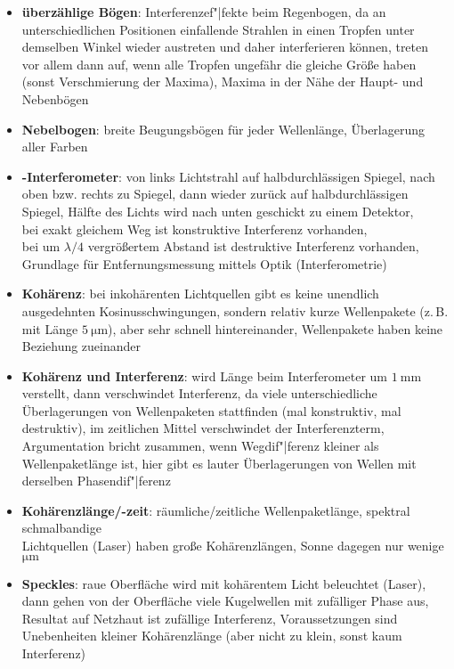 \linie
\begin{itemize}
    \item
    \textbf{überzählige Bögen}:
    Interferenzef"|fekte beim Regenbogen, da
    an unterschiedlichen Positionen einfallende Strahlen in einen Tropfen
    unter demselben Winkel wieder austreten und daher interferieren können,
    treten vor allem dann auf, wenn alle Tropfen ungefähr die gleiche Größe
    haben (sonst Verschmierung der Maxima),
    Maxima in der Nähe der Haupt- und Nebenbögen

    \item
    \textbf{Nebelbogen}:
    breite Beugungsbögen für jeder Wellenlänge, Überlagerung aller Farben
\end{itemize}
\linie
\pagebreak
\begin{itemize}
    \item
    \textbf{-Interferometer}:
    von links Lichtstrahl auf halbdurchlässigen Spiegel, nach oben bzw. rechts
    zu Spiegel, dann wieder zurück auf halbdurchlässigen Spiegel,
    Hälfte des Lichts wird nach unten geschickt zu einem Detektor, \\
    bei exakt gleichem Weg ist konstruktive Interferenz vorhanden, \\
    bei um $\lambda/4$ vergrößertem Abstand ist destruktive Interferenz
    vorhanden, \\
    Grundlage für Entfernungsmessung mittels Optik (Interferometrie)

    \item
    \textbf{Kohärenz}:
    bei inkohärenten Lichtquellen gibt es keine unendlich ausgedehnten
    Kosinusschwingungen, sondern relativ kurze Wellenpakete
    (z.\,B. mit Länge $\SI{5}{\micro\meter}$), aber sehr schnell hintereinander,
    Wellenpakete haben keine Beziehung zueinander

    \item
    \textbf{Kohärenz und Interferenz}:
    wird Länge beim Interferometer um $\SI{1}{\milli\meter}$ verstellt, dann
    verschwindet Interferenz, da viele unterschiedliche Überlagerungen
    von Wellenpaketen stattfinden (mal konstruktiv, mal destruktiv),
    im zeitlichen Mittel verschwindet der Interferenzterm,
    Argumentation bricht zusammen, wenn Wegdif"|ferenz kleiner als
    Wellenpaketlänge ist,
    hier gibt es lauter Überlagerungen von Wellen mit derselben
    Phasendif"|ferenz

    \item
    \textbf{Kohärenzlänge/-zeit}:
    räumliche/zeitliche Wellenpaketlänge,
    spektral schmalbandige \\
    Lichtquellen (Laser) haben große Kohärenzlängen,
    Sonne dagegen nur wenige $\si{\micro\meter}$

    \item
    \textbf{Speckles}:
    raue Oberfläche wird mit kohärentem Licht beleuchtet (Laser),
    dann gehen von der Oberfläche viele Kugelwellen mit zufälliger Phase
    aus, Resultat auf Netzhaut ist zufällige Interferenz,
    Voraussetzungen sind Unebenheiten kleiner Kohärenzlänge
    (aber nicht zu klein, sonst kaum Interferenz)
\end{itemize}
